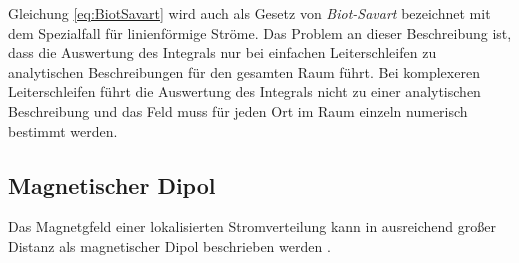 Gleichung \ref{eq:BiotSavart} wird auch als Gesetz von \textit{Biot-Savart} \cite{john_david_jackson_klassische_nodate} bezeichnet mit dem Spezialfall für linienförmige Ströme. Das Problem an dieser Beschreibung ist, dass die Auswertung des Integrals nur bei einfachen Leiterschleifen zu analytischen Beschreibungen für den gesamten Raum führt. Bei komplexeren Leiterschleifen führt die Auswertung des Integrals nicht zu einer analytischen Beschreibung und das Feld muss für jeden Ort im Raum einzeln numerisch bestimmt werden.

\subsection{Magnetischer Dipol}
\label{subsec:Mag_Dipol}
Das Magnetgfeld einer lokalisierten Stromverteilung kann in ausreichend großer Distanz als magnetischer Dipol beschrieben werden \cite{wolfgang_nolting_grundkurs_nodate,paperno_cylindrical_2004}.

